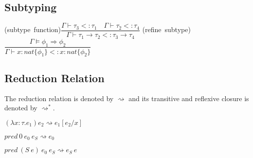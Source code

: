 \documentclass[12pt,a4paper,titlepage]{article}
\newcommand{\ts}{\vdash}
\newcommand{\dts}{\vDash}
\newcommand{\tj}[3]{\mbox{(#1)$\dfrac{#2}{#3}$}\quad}
\begin{document}
\begin{spacing}{2.5}
        \subsection{Subtyping}
        \begin{center}
            \tj{subtype function}{
                \Gamma \ts \tau_3 <: \tau_1 \quad \Gamma \ts \tau_2 <: \tau_4
            }{
                \Gamma \ts \tau_1 \rightarrow \tau_2 <: \tau_3 \rightarrow \tau_4
            }
            \tj{refine subtype}{
                \Gamma \dts \phi_1 \Rightarrow \phi_2
            }{
                \Gamma \ts x:nat\{\phi_1\} <: x:nat\{\phi_2\}
            }
        \end{center}
        \subsection{Reduction Relation}
        The reduction relation is denoted by $\rightsquigarrow$ and its transitive and reflexive closure is
        denoted by $\rightsquigarrow^*$.

        $(\lambda x:\tau . e_1) e_2 \rightsquigarrow e_1 [ e_2 / x ]$

        $pred\ 0\ e_0\ e_S \rightsquigarrow e_0$

        $pred\ (S\ e)\ e_0\ e_S \rightsquigarrow e_S\ e$
    \end{spacing}
\end{document}
